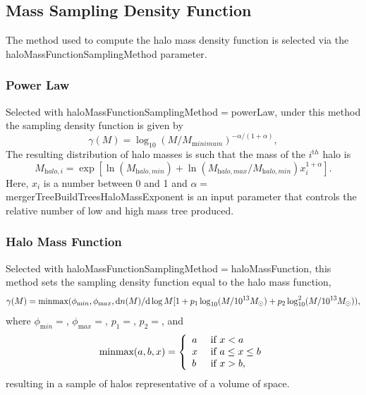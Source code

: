 \subsection{Mass Sampling Density Function}\label{sec:MassSamplingDensityFunction}

The method used to compute the halo mass density function is selected via the {\normalfont \ttfamily haloMassFunctionSamplingMethod} parameter.

\subsubsection{Power Law}

Selected with {\normalfont \ttfamily haloMassFunctionSamplingMethod}$=${\normalfont \ttfamily powerLaw}, under this method the sampling density function is given by
\begin{equation}
\gamma(M) = \log_{10}(M/M_{\mathrm minimum})^{-\alpha/(1+\alpha)},
\end{equation}
The resulting distribution of halo masses is such that the mass of the $i^{\mathrm th}$ halo is
\begin{equation}
 M_{\mathrm halo,i} = \exp\left[ \ln(M_{\mathrm halo,min}) + \ln\left({M_{\mathrm halo,max}/M_{\mathrm halo,min}}\right) x_i^{1+\alpha} \right].
\end{equation}
Here, $x_i$ is a number between 0 and 1 and $\alpha=${\normalfont \ttfamily mergerTreeBuildTreesHaloMassExponent} is an input parameter that controls the relative number of low and high mass tree produced.

\subsubsection{Halo Mass Function}

Selected with {\normalfont \ttfamily haloMassFunctionSamplingMethod}$=${\normalfont \ttfamily haloMassFunction}, this method sets the sampling density function equal to the halo mass function,
\begin{equation}
\gamma(M) = \hbox{minmax}(\phi_{\mathrm min},\phi_{\mathrm max},{\mathrm d} n(M)/{\mathrm d}\log M [1 + p_1 \log_{10}(M/10^{13}M_\odot) + p_2 \log_{10}^2(M/10^{13}M_\odot)),
\end{equation}
 where $\phi_{\mathrm min}=${\normalfont \ttfamily [haloMassFunctionSamplingAbundanceMinimum]}, $\phi_{\mathrm max}=${\normalfont \ttfamily [haloMassFunctionSamplingAbundanceMaximum]}, $p_1=${\normalfont \ttfamily [haloMassFunctionSamplingModifier1]}, $p_2=${\normalfont \ttfamily [haloMassFunctionSamplingModifier2]}, and
\begin{equation}
 \hbox{minmax}(a,b,x) = \left\{\begin{array}{ll}a & \hbox{ if } x < a \\ x & \hbox{ if } a \leq x \leq b\\ b & \hbox{ if } x > b,\end{array}\right.
\end{equation}
resulting in a sample of halos representative of a volume of space.

